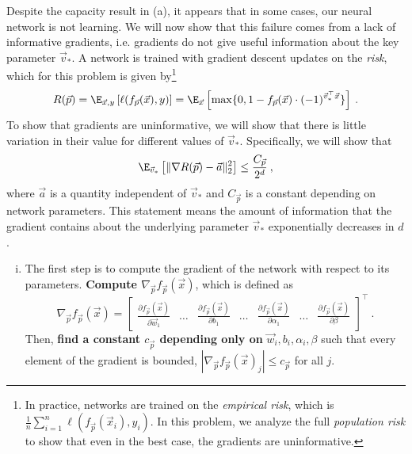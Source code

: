 \documentclass[11pt]{article}
\begin{document}
\begin{Parts}
\Part Despite the capacity result in (a), it appears that in some cases, our neural network is not learning. We will now show that this failure comes from a lack of informative gradients, i.e. gradients do not give useful information about the key parameter $\vec v_*$. A network is trained with gradient descent updates on the \emph{risk}, which for this problem is given by\footnote{
	In practice, networks are trained on the \emph{empirical risk}, which is $\frac{1}{n}\sum_{i=1}^n\ell(f_{\vec p}(\vec x_i), y_i)$. In this problem, we analyze the full \emph{population risk} to show that even in the best case, the gradients are uninformative.
}
\[R(\vec p) = \E_{\vec x,y}\left[\ell(f_{\vec p}(\vec x), y)\right] = \E_{\vec x}\left[\max\{0,1-f_{\vec p}(\vec x)\cdot (-1)^{\vec v_*^\top \vec x}\} \right]\:.\]
To show that gradients are uninformative, we will show that there is little variation in their value for different values of $\vec v_*$.
Specifically, we will show that
\[\E_{\vec v_*}\left[\|\nabla R(\vec p) - \vec a\|_2^2\right] \leq \frac{C_{\vec p}}{2^d}\:,\]
where $\vec a$ is a quantity independent of $\vec v_*$ and $C_{\vec{p}}$ is a constant depending on network parameters. 
This statement means the amount of information that the gradient contains about the underlying parameter $\vec v_*$ exponentially decreases in $d$.
\begin{enumerate}[(i)]
\item The first step is to compute the gradient of the network with respect to its parameters.
{\bf Compute $\nabla_{\vec p} f_{\vec p}(\vec x)$}, which is defined as
\[\nabla_{\vec p} f_{\vec p}(\vec x) = 
\begin{bmatrix}
\frac{\partial f_{\vec p}(\vec x)}{\partial \vec w_{1}} 
 & \dots &
\frac{\partial f_{\vec p}(\vec x)}{\partial b_{1}}
 & \dots &
\frac{\partial f_{\vec p}(\vec x)}{\partial \alpha_{1}}
 & \dots &
\frac{\partial f_{\vec p}(\vec x)}{\partial \beta}
\end{bmatrix}^\top \:.\]
Then, {\bf find a constant $c_{\vec p}$ depending only on} $\vec w_i,b_i,\alpha_i,\beta$ such that every element of the gradient is bounded, $|\nabla_{\vec p} f_{\vec p}(\vec x)_j| \leq c_{\vec p}$ for all $j$.


\end{enumerate}
\end{Parts}
\end{document}
